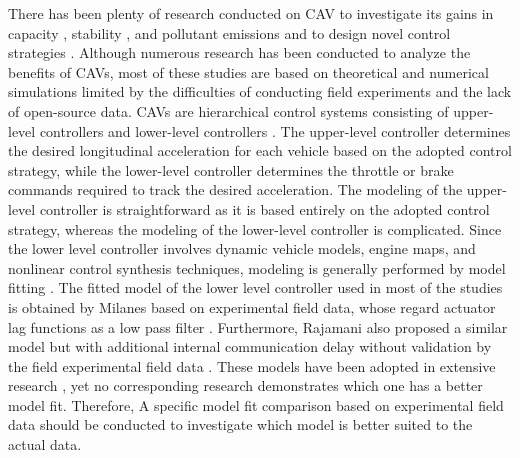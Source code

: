 \documentclass[a4paper]{cas-sc}
\begin{document}
There has been plenty of research conducted on CAV to investigate its gains in capacity \citep{Zhao2020,Gong2018a}, stability \citep{Zhou2019c,Talebpour2017a}, and pollutant emissions \citep{Wang2022,Silgu2020} and to design novel control strategies \citep{Flores2018a,Wang2019a}. Although numerous research has been conducted to analyze the benefits of CAVs, most of these studies are based on theoretical and numerical simulations limited by the difficulties of conducting field experiments and the lack of open-source data. CAVs are hierarchical control systems consisting of upper-level controllers and lower-level controllers \citep{Wang2018e}. The upper-level controller determines the desired longitudinal acceleration for each vehicle based on the adopted control strategy, while the lower-level controller determines the throttle or brake commands required to track the desired acceleration. The modeling of the upper-level controller is straightforward as it is based entirely on the adopted control strategy, whereas the modeling of the lower-level controller is complicated. Since the lower level controller involves dynamic vehicle models, engine maps, and nonlinear control synthesis techniques, modeling is generally performed by model fitting \citep{Zheng2014a,Zheng2015a}. The fitted model of the lower level controller used in most of the studies is obtained by Milanes based on experimental field data, whose regard actuator lag functions as a low pass filter \citep{milanes2014modeling}. Furthermore, Rajamani also proposed a similar model but with additional internal communication delay without validation by the field experimental field data \citep{rajamani2011vehicle}. These models have been adopted in extensive research \citep{Navas2019a,Lai2020}, yet no corresponding research demonstrates which one has a better model fit. Therefore, A specific model fit comparison based on experimental field data should be conducted to investigate which model is better suited to the actual data.
\end{document}
